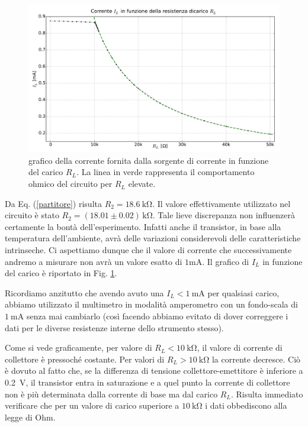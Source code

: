 \begin{figure}[H]
\centering
	\includegraphics[scale=0.45]{sorgente.pdf}
	\caption{grafico della corrente fornita dalla sorgente di corrente in funzione del carico $R_L$. La linea in verde rappresenta il comportamento ohmico del circuito per $R_L$ elevate.}
	\label{fig:sorg}
\end{figure}

Da Eq. (\ref{partitore}) risulta $R_2 = \SI{18.6}{\kilo\ohm} $.
Il valore effettivamente utilizzato nel circuito è stato $R_2 = (18.01 \pm 0.02 )\,\si{\kilo\ohm} $.
Tale lieve discrepanza non influenzerà certamente la bontà dell'esperimento.
Infatti anche il transistor, in base alla temperatura dell'ambiente, avrà delle variazioni considerevoli delle caratteristiche intrinseche.
Ci aspettiamo dunque che il valore di corrente che successivamente andremo a misurare non avrà un valore esatto di $1\si{\milli\ampere}$. 
Il grafico di $I_L$ in funzione del carico è riportato in Fig. \ref{fig:sorg}.

Ricordiamo anzitutto che avendo avuto una $I_L<\SI{1}{\milli\ampere}$ per qualsiasi carico, abbiamo utilizzato il multimetro in modalità amperometro con un fondo-scala di $\SI{1}{\milli\ampere}$ senza mai cambiarlo (così facendo abbiamo evitato di dover correggere i dati per le diverse resistenze interne dello strumento stesso).

Come si vede graficamente, per valore di $R_L<\SI{10}{\kilo\ohm}$, il valore di corrente di collettore è pressoché costante.
Per valori di $R_L>\SI{10}{\kilo\ohm}$ la corrente decresce.
Ciò è dovuto al fatto che, se la differenza di tensione collettore-emettitore è inferiore a \SI{0.2}{\volt}, il transistor entra in saturazione e a quel punto la corrente di  collettore non è più determinata dalla corrente di base ma dal carico $R_L$.
Risulta immediato verificare che  per un valore di carico superiore a $\SI{10}{\kilo\ohm}$ i dati obbediscono alla legge di Ohm.

